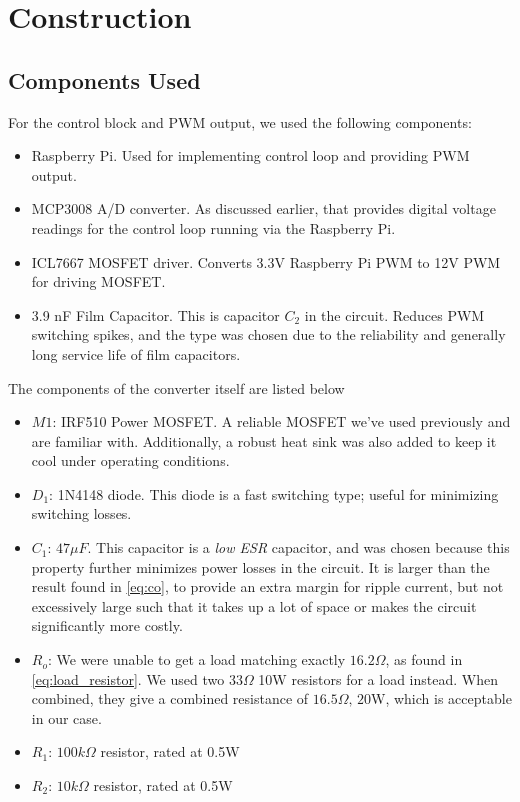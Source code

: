 \documentclass[a4paper, 12pt]{article}
\begin{document}


\section{Construction}

\subsection{Components Used}

For the control block and PWM output, we used the following components:
\begin{itemize}
  \item Raspberry Pi. Used for implementing control loop and providing PWM
    output.
  \item MCP3008 A/D converter. As discussed earlier, that provides digital
    voltage readings for the control loop running via the Raspberry Pi.
  \item ICL7667 MOSFET driver. Converts 3.3V Raspberry Pi PWM to 12V PWM for
    driving MOSFET.
  \item 3.9 nF Film Capacitor. This is capacitor $C_2$ in the circuit. Reduces
    PWM switching spikes, and the type was chosen due to the reliability and
    generally long service life of film capacitors.
\end{itemize}

\noindent
The components of the converter itself are listed below
\begin{itemize}
  \item $M1$: IRF510 Power MOSFET. A reliable MOSFET we've used previously and
    are familiar with. Additionally, a robust heat sink was also added to keep
    it cool under operating conditions.
  \item $D_1$: 1N4148 diode. This diode is a fast switching type; useful for
    minimizing switching losses.
  \item $C_1$: $47 \mu F$. This capacitor is a \textit{low ESR} capacitor, and
    was chosen because this property further minimizes power losses in the
    circuit. It is larger than the result found in \eqref{eq:co}, to provide an
    extra margin for ripple current, but not excessively large such that it
    takes up a lot of space or makes the circuit significantly more costly.
  \item $R_o$: We were unable to get a load matching exactly $16.2\Omega$, as
    found in \ref{eq:load_resistor}. We used two $33\Omega$ 10W resistors for a
    load instead. When combined, they give a combined resistance of
    $16.5\Omega,\, 20$W, which is acceptable in our case.
  \item $R_1$: $100k\Omega$ resistor, rated at 0.5W
  \item $R_2$: $10k\Omega$ resistor, rated at 0.5W
\end{itemize}
\end{document}
